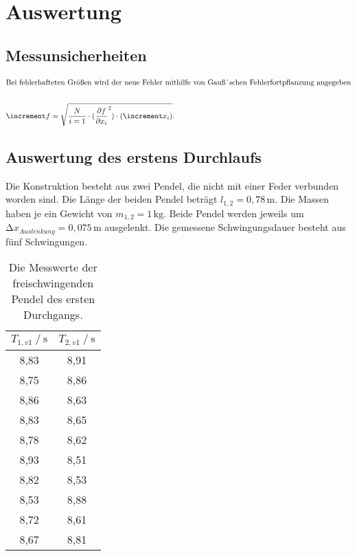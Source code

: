\section{Auswertung}

\subsection{Messunsicherheiten}

\begin{align*}
    \intertext{Bei fehlerhafteten Größen wird der neue Fehler mithilfe von Gauß´schen Fehlerfortpflanzung angegeben}\\
    \increment f = \sqrt{\frac{N}{i=1} \cdot (\frac{\partial f}{\partial x_{i}}^2) \cdot (\increment x_{i}) }.
\end{align*} 

\subsection{Auswertung des erstens Durchlaufs}

\begin{flushleft}
    Die Konstruktion besteht aus zwei Pendel, die nicht mit einer Feder verbunden worden sind. 
    Die Länge der beiden Pendel beträgt $ l_{1,2} = 0,78 \, \unit{\meter} $.
    Die Massen haben je ein Gewicht von $ m_{1,2} = 1\, \unit{\kilo\gram} $.
    Beide Pendel werden jeweils um $ \increment x_{Auslenkung} = 0,075 \, \unit{\meter} $ ausgelenkt. 
    Die gemessene Schwingungsdauer besteht aus fünf Schwingungen.
\end{flushleft} 

\begin{table}[H]
    \centering
    \caption{Die Messwerte der freischwingenden Pendel des ersten Durchgangs.}
    \label{Tabelle1}
    \begin{tabular} {c  c}
        \toprule
        {$T_{1,v1} \mathbin{/} \unit{\second}$} &
        {$T_{2,v1} \mathbin{/} \unit{\second}$} \\
        \midrule
         8,83 & 8,91 \\
         8,75 & 8,86 \\
         8,86 & 8,63 \\
         8,83 & 8,65\\
         8,78 & 8,62 \\
         8,93 & 8,51 \\
         8,82 & 8,53 \\
         8,53 & 8,88 \\
         8,72 & 8,61 \\ 
         8,67 & 8,81 \\
        \bottomrule
    \end{tabular} 
\end{table}

